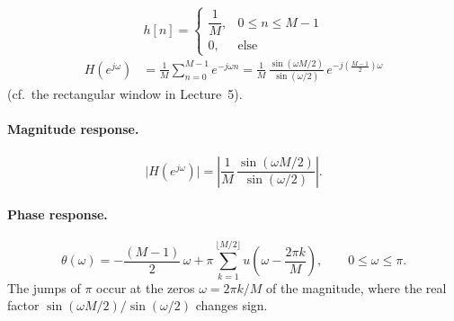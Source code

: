 \documentclass[handout_subfiles_root.tex]{subfiles}
\begin{document}
\begin{examplebox}[title={Example (Moving-Average Filter)}, handout mark=6, breakable]
\begin{equation*}
h[n] = \begin{cases} \dfrac{1}{M}, & 0\le n\le M-1 \\[4pt] 0, & \text{else} \end{cases}
\end{equation*}
\begin{align*}
H(e^{j\omega}) &= \frac{1}{M}\sum_{n=0}^{M-1} e^{-j\omega n}
= \frac{1}{M}\,\frac{\sin\!\left(\omega M/2\right)}{\sin\!\left(\omega/2\right)}\,e^{-j\left(\frac{M-1}{2}\right)\omega}
\end{align*}
(cf.\ the rectangular window in Lecture~5).

\paragraph{Magnitude response.}
\begin{equation*}
\big|H(e^{j\omega})\big| = \left|\frac{1}{M}\,\frac{\sin(\omega M/2)}{\sin(\omega/2)}\right|.
\end{equation*}

\paragraph{Phase response.}
\begin{equation*}
\theta(\omega) = -\frac{(M-1)}{2}\,\omega + \pi\sum_{k=1}^{\lfloor M/2\rfloor} u\!\left(\omega-\frac{2\pi k}{M}\right), \qquad 0\le\omega\le\pi.
\end{equation*}
The jumps of $\pi$ occur at the zeros $\omega = 2\pi k/M$ of the magnitude, where the real factor $\sin(\omega M/2)/\sin(\omega/2)$ changes sign.


\end{examplebox}
\end{document}

